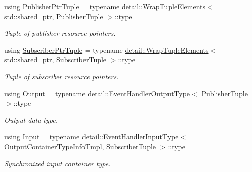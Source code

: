 \begin{DoxyCompactItemize}
\item 
\mbox{\label{classflow__ros_1_1_event_handler_aced903010cf36b1ce0d9bceb0f7ac64a}} 
using \hyperlink{classflow__ros_1_1_event_handler_aced903010cf36b1ce0d9bceb0f7ac64a}{Publisher\+Ptr\+Tuple} = typename \hyperlink{structflow__ros_1_1detail_1_1_wrap_tuple_elements}{detail\+::\+Wrap\+Tuple\+Elements}$<$ std\+::shared\+\_\+ptr, Publisher\+Tuple $>$\+::type
\begin{DoxyCompactList}\small\item\em Tuple of publisher resource pointers. \end{DoxyCompactList}\item 
\mbox{\label{classflow__ros_1_1_event_handler_a5c37a3eace3da99b2068cfa1fd34449a}} 
using \hyperlink{classflow__ros_1_1_event_handler_a5c37a3eace3da99b2068cfa1fd34449a}{Subscriber\+Ptr\+Tuple} = typename \hyperlink{structflow__ros_1_1detail_1_1_wrap_tuple_elements}{detail\+::\+Wrap\+Tuple\+Elements}$<$ std\+::shared\+\_\+ptr, Subscriber\+Tuple $>$\+::type
\begin{DoxyCompactList}\small\item\em Tuple of subscriber resource pointers. \end{DoxyCompactList}\item 
using \hyperlink{classflow__ros_1_1_event_handler_ae5dc263e5c12a4b7fb60f320dc403173}{Output} = typename \hyperlink{structflow__ros_1_1detail_1_1_event_handler_output_type}{detail\+::\+Event\+Handler\+Output\+Type}$<$ Publisher\+Tuple $>$\+::type
\begin{DoxyCompactList}\small\item\em Output data type. \end{DoxyCompactList}\item 
using \hyperlink{classflow__ros_1_1_event_handler_a53af7756aaf98646281d57b036510d56}{Input} = typename \hyperlink{structflow__ros_1_1detail_1_1_event_handler_input_type}{detail\+::\+Event\+Handler\+Input\+Type}$<$ Output\+Container\+Type\+Info\+Tmpl, Subscriber\+Tuple $>$\+::type
\begin{DoxyCompactList}\small\item\em Synchronized input container type. \end{DoxyCompactList}\end{DoxyCompactItemize}
